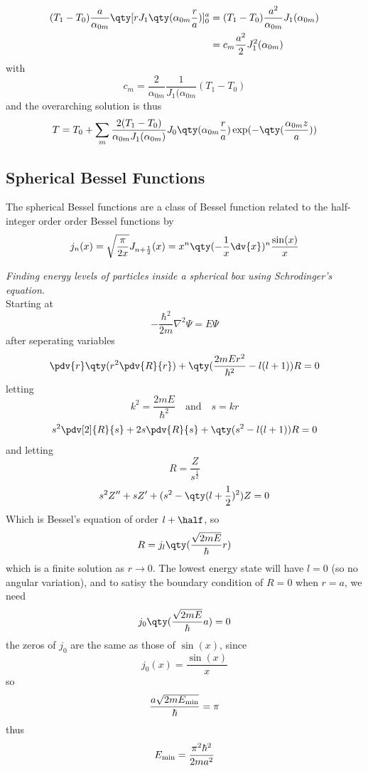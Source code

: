 \begin{example}
\begin{align*}
(T_1-T_0) \frac{a}{\alpha_{0m}} \qty[ r J_1 \qty( \alpha_{0m} \frac{r}{a})]_0^a &= (T_1 - T_0) \frac{a^2}{\alpha_{0m}} J_1 (\alpha_{0m})\\
&= c_m \frac{a^2}{2} J_1^2 (\alpha_{0m})
\end{align*}
with
\[ c_m = \frac{2}{\alpha_{0m}} \frac{1}{J_1(\alpha_{0m}} (T_1-T_0) \]
and the overarching solution is thus
\begin{equation*}
  T = T_0 + \sum_m \frac{2 (T_1-T_0)}{\alpha_{0m}J_1(\alpha_{0m})} J_0 \qty( \alpha_{0m} \frac{r}{a}) \exp( - \qty(\frac{\alpha_{0m}z}{a}) )
\end{equation*}
\end{example}

\subsection{Spherical Bessel Functions}
\label{sec:sphbess}

The spherical Bessel functions are a class of Bessel function related to the half-integer order order Bessel functions by
\begin{equation}
  \label{eq:sphericalbess}
  j_n(x) = \sqrt{\frac{\pi}{2x}} J_{n+\frac{1}{2}}(x) = x^n \qty(- \frac{1}{x} \dv{x})^n \frac{\sin(x)}{x}
\end{equation}
\begin{example}
{\em Finding energy levels of particles inside a spherical box using Schrodinger's equation.}\\
Starting at 
\[ - \frac{\hbar^2}{2m} \nabla^2 \Psi = E \Psi \]
after seperating variables
\[ \pdv{r} \qty(r^2 \pdv{R}{r}) + \qty( \frac{2mEr^2}{\hbar^2} - l(l+1) )R=0 \]
letting 
\[ k^2 = \frac{2mE}{\hbar^2} \quad \text{and} \quad s=kr\]
\[ s^2 \pdv[2]{R}{s} + 2s \pdv{R}{s} + \qty(s^2 - l(l+1))R = 0 \]
and letting
\[ R = \frac{Z}{s^{\frac{1}{2}}} \]
\[ s^2Z^{\prime \prime} + s Z^{\prime} + (s^2 - \qty(l + \frac{1}{2})^2 ) Z = 0 \]
Which is Bessel's equation of order $l+\half$, so
\[ R = j_l \qty( \frac{\sqrt{2mE}}{\hbar} r) \]
which is a finite solution as $r \to 0$.
The lowest energy state will have $l=0$ (so no angular variation), and to satisy the boundary condition of $R=0$ when $r=a$, we need
\[ j_0 \qty( \frac{\sqrt{2mE}}{\hbar}a)=0 \]
the zeros of $j_0$ are the same as those of $\sin(x)$, since
\[ j_0(x) = \frac{\sin(x)}{x} \]
so
\[ \frac{a \sqrt{2mE_{\rm min}}}{\hbar} = \pi \]
thus
\[ E_{\rm min} = \frac{\pi^2 \hbar^2}{2ma^2} \]
\end{example}
